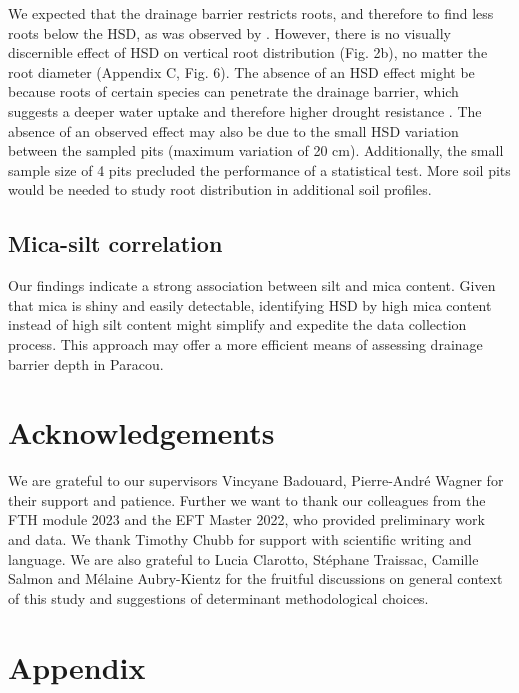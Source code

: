 \documentclass[fleqn,12pt]{latex/stylish_article} %
\begin{document}
We expected that the drainage barrier restricts roots, and therefore to find less roots below the HSD, as was observed by \citet{humbelCaracterisationParMesures1978}. However, there is no visually discernible effect of HSD on vertical root distribution (Fig. 2b), no matter the root diameter (Appendix C, Fig. 6). The absence of an HSD effect might be because roots of certain species can penetrate the drainage barrier, which suggests a deeper water uptake and therefore higher drought resistance \citep{ferryGeneseFonctionnementHydrique2003}. The absence of an observed effect may also be due to the small HSD variation between the sampled pits (maximum variation of 20 cm). Additionally, the small sample size of 4 pits precluded the performance of a statistical test. More soil pits would be needed to study root distribution in additional soil profiles.

\hypertarget{mica-silt-correlation}{%
\subsection{Mica-silt correlation}\label{mica-silt-correlation}}

Our findings indicate a strong association between silt and mica content. Given that mica is shiny and easily detectable, identifying HSD by high mica content instead of high silt content might simplify and expedite the data collection process. This approach may offer a more efficient means of assessing drainage barrier depth in Paracou.

\hypertarget{acknowledgements}{%
\section{Acknowledgements}\label{acknowledgements}}

We are grateful to our supervisors Vincyane Badouard, Pierre-André Wagner for their support and patience. Further we want to thank our colleagues from the FTH module 2023 and the EFT Master 2022, who provided preliminary work and data. We thank Timothy Chubb for support with scientific writing and language. We are also grateful to Lucia Clarotto, Stéphane Traissac, Camille Salmon and Mélaine Aubry-Kientz for the fruitful discussions on general context of this study and suggestions of determinant methodological choices.

\hypertarget{appendix}{%
\section{Appendix}\label{appendix}}
\end{document}
